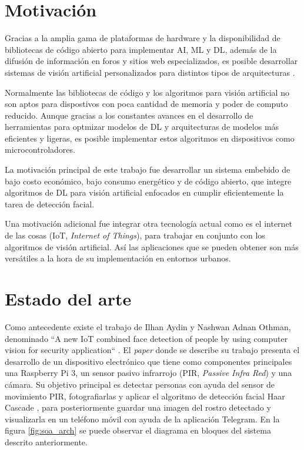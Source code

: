 \section{Motivación}
Gracias a la amplia gama de plataformas de hardware y la disponibilidad de bibliotecas de código abierto para implementar AI, ML y DL, además de la difusión de información en foros y sitios web especializados, es posible desarrollar sistemas de visión artificial personalizados para distintos tipos de arquitecturas \cite{mot_emb}.

Normalmente las bibliotecas de código y los algoritmos para visión artificial no son aptos para dispostivos con poca cantidad de memoria y poder de computo reducido. Aunque gracias a los constantes avances en el desarrollo de herramientas para optmizar modelos de DL y arquitecturas de modelos más eficientes y ligeras, es posible implementar estos algoritmos en dispositivos como microcontroladores.

La motivación principal de este trabajo fue desarrollar un sistema embebido de bajo costo económico, bajo consumo energético y de código abierto, que integre algoritmos de DL para visión artificial enfocados en cumplir eficientemente la tarea de detección facial.

Una motivación adicional fue integrar otra tecnología actual como es el internet de las cosas (IoT, \textit{Internet of Things}), para trabajar en conjunto con los algoritmos de visión artificial. Así las aplicaciones que se pueden obtener son más versátiles a la hora de su implementación en entornos urbanos.

\section{Estado del arte}
Como antecedente existe el trabajo de Ilhan Aydin y Nashwan Adnan Othman, denominado ``A new IoT combined face detection of people by using computer vision for security application`` \cite{soa_ref}. El \textit{paper} donde se describe su trabajo presenta el desarrollo de un dispositivo electrónico que tiene como componentes principales una Raspberry Pi 3, un sensor pasivo infrarrojo (PIR, \textit{Passive Infra Red}) y una cámara. Su objetivo principal es detectar personas con ayuda del sensor de movimiento PIR, fotografiarlas y aplicar el algoritmo de detección facial Haar Cascade \cite{haar_cascade}, para posteriormente guardar una imagen del rostro detectado y visualizarla en un teléfono móvil con ayuda de la aplicación Telegram. En la figura \ref{fig:soa_arch} se puede observar el diagrama en bloques del sistema descrito anteriormente.

